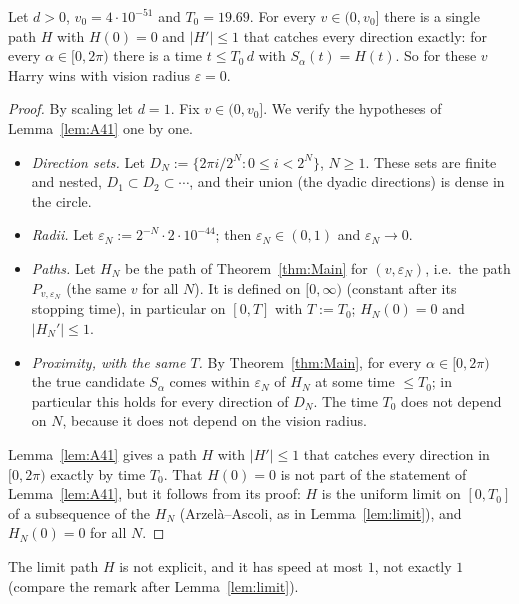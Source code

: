 \begin{corollary}\label{cor:Exact}
Let $d>0$, $v_0=4\cdot10^{-51}$ and $T_0=19.69$. For every $v\in(0,v_0]$ there is a single path $H$ with $H(0)=0$ and
$|H'|\le1$ that catches every direction exactly: for every $\alpha\in[0,2\pi)$ there is a time $t\le T_0\,d$ with
$S_\alpha(t)=H(t)$. So for these $v$ Harry wins with vision radius $\varepsilon=0$.
\end{corollary}
\begin{proof}
By scaling let $d=1$. Fix $v\in(0,v_0]$. We verify the hypotheses of Lemma~\ref{lem:A41} one by one.
\begin{itemize}
\item \emph{Direction sets.} Let $D_N:=\{2\pi i/2^N:0\le i<2^N\}$, $N\ge1$. These sets are finite and nested,
$D_1\subset D_2\subset\cdots$, and their union (the dyadic directions) is dense in the circle.
\item \emph{Radii.} Let $\varepsilon_N:=2^{-N}\cdot2\cdot10^{-44}$; then $\varepsilon_N\in(0,1)$ and $\varepsilon_N\to0$.
\item \emph{Paths.} Let $H_N$ be the path of Theorem~\ref{thm:Main} for $(v,\varepsilon_N)$, i.e.\ the path
$P_{v,\varepsilon_N}$ (the same $v$ for all $N$). It is defined on $[0,\infty)$ (constant after its stopping time), in particular
on $[0,T]$ with $T:=T_0$; $H_N(0)=0$ and $|H_N'|\le1$.
\item \emph{Proximity, with the same $T$.} By Theorem~\ref{thm:Main}, for every $\alpha\in[0,2\pi)$ the true candidate
$S_\alpha$ comes within $\varepsilon_N$ of $H_N$ at some time $\le T_0$; in particular this holds for every direction of $D_N$.
The time $T_0$ does not depend on $N$, because it does not depend on the vision radius.
\end{itemize}
Lemma~\ref{lem:A41} gives a path $H$ with $|H'|\le1$ that catches every direction in $[0,2\pi)$ exactly by time $T_0$. That
$H(0)=0$ is not part of the statement of Lemma~\ref{lem:A41}, but it follows from its proof: $H$ is the uniform limit on $[0,T_0]$
of a subsequence of the $H_N$ (Arzel\`a--Ascoli, as in Lemma~\ref{lem:limit}), and $H_N(0)=0$ for all $N$.
\end{proof}
The limit path $H$ is not explicit, and it has speed at most $1$, not exactly $1$ (compare the remark after
Lemma~\ref{lem:limit}).

